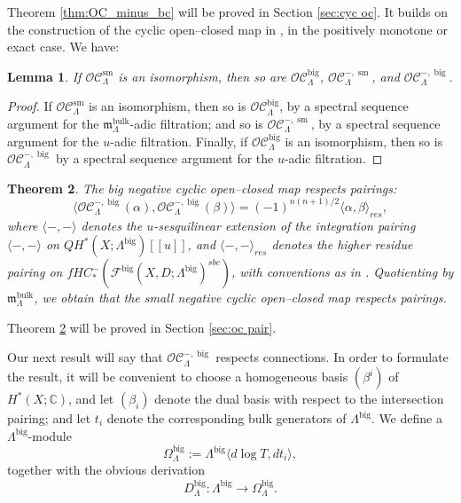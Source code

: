 \documentclass{article}
\newtheorem{lem}{Lemma}[section]
\newtheorem{thm}[lem]{Theorem}
\def\fuk{\EuF}
\newcommand{\fm}{\mathfrak{m}}
\def\cO{\mathcal{O}}
\def\cC{\mathcal{C}}
\def\fuk{\mathcal{F}}
\def\C{\mathbb{C}}
\def\big{{\operatorname{big}}}
\def\sm{{\operatorname{sm}}}
\def\signn{{n(n+1)/2}}
\def\bulk{{\operatorname{bulk}}}
\def\novblam{t}
\begin{document}
Theorem \ref{thm:OC_minus_bc} will be proved in Section \ref{sec:cyc oc}. It builds on the construction of the cyclic open--closed map in \cite{Ganatra:cyclic}, in the positively monotone or exact case. 
We have:

\begin{lem}\label{lem:OCiso}
    If $\cO\cC_\Lambda^\sm$ is an isomorphism, then so are $\cO\cC_\Lambda^\big$, $\cO\cC_\Lambda^{-,\sm}$, and $\cO\cC_\Lambda^{-, \big}$.
\end{lem}
\begin{proof}
    If $\cO\cC_\Lambda^{\sm}$ is an isomorphism, then so is $\cO\cC_\Lambda^\big$, by a spectral sequence argument for the $\fm^\bulk_\Lambda$-adic filtration; and so is $\cO\cC_\Lambda^{-,\sm}$, by a spectral sequence argument for the $u$-adic filtration. 
    Finally, if $\cO\cC_\Lambda^{\big}$ is an isomorphism, then so is $\cO\cC_\Lambda^{-,\big}$ by a spectral sequence argument for the $u$-adic filtration.
\end{proof}

\begin{thm}\label{thm:oc_hres_bc}
    The big negative cyclic open--closed map respects pairings:
    $$\langle \cO\cC_\Lambda^{-,\big}(\alpha),\cO\cC_\Lambda^{-,\big}(\beta)\rangle = (-1)^\signn \langle \alpha,\beta \rangle_{res},$$
    where $\langle -,-\rangle$ denotes the $u$-sesquilinear extension of the integration pairing $\langle-,-\rangle$ on $QH^*(X;\Lambda^\big)[[u]]$, and $\langle -,-\rangle_{res}$ denotes the higher residue pairing on $fHC_*^-(\fuk^\big(X,D;\Lambda^\big)^{sbc})$, with conventions as in \cite[Definition 5.33]{Sheridan_formulae}. 
    Quotienting by $\fm^\bulk_\Lambda$, we obtain that the small negative cyclic open--closed map respects pairings.
\end{thm}

Theorem \ref{thm:oc_hres_bc} will be proved in Section \ref{sec:oc pair}.

Our next result will say that $\cO\cC_\Lambda^{-,\big}$ respects connections. 
In order to formulate the result, it will be convenient to choose a homogeneous basis $(\beta^i)$ of $H^*(X;\C)$, and let $(\beta_i)$ denote the dual basis with respect to the intersection pairing; and let $\novblam_i$ denote the corresponding bulk generators of $\Lambda^\big$. We define a $\Lambda^\big$-module 
$$\Omega^\big_\Lambda := \Lambda^\big \langle d\log T, d\novblam_i \rangle,$$
together with the obvious derivation
$$D^\big_\Lambda:\Lambda^\big \to \Omega^\big_\Lambda.$$
\end{document}
